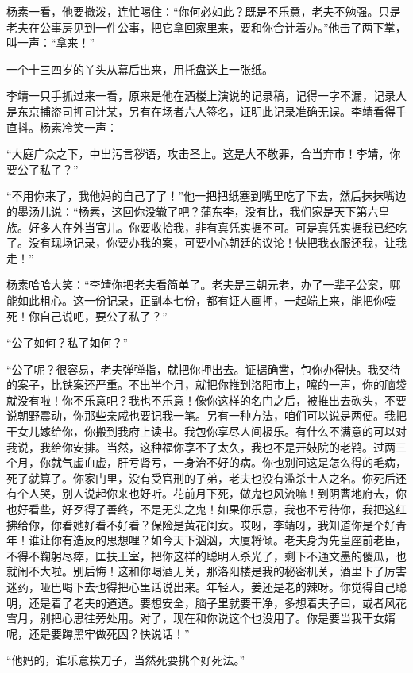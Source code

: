 杨素一看，他要撤泼，连忙喝住：“你何必如此？既是不乐意，老夫不勉强。只是老夫在公事房见到一件公事，把它拿回家里来，要和你合计着办。”他击了两下掌，叫一声：“拿来！”

一个十三四岁的丫头从幕后出来，用托盘送上一张纸。

李靖一只手抓过来一看，原来是他在酒楼上演说的记录稿，记得一字不漏，记录人是东京捕盗司押司计某，另有在场者六人签名，证明此记录准确无误。李靖看得手直抖。杨素冷笑一声：

“大庭广众之下，中出污言秽语，攻击圣上。这是大不敬罪，合当弃市！李靖，你要公了私了？”

“不用你来了，我他妈的自己了了！”他一把把纸塞到嘴里吃了下去，然后抹抹嘴边的墨汤儿说：“杨素，这回你没辙了吧？蒲东李，没有比，我们家是天下第六皇族。好多人在外当官儿。你要收拾我，非有真凭实据不可。可是真凭实据我已经吃了。没有现场记录，你要办我的案，可要小心朝廷的议论！快把我衣服还我，让我走！”

杨素哈哈大笑：“李靖你把老夫看简单了。老夫是三朝元老，办了一辈子公案，哪能如此粗心。这一份记录，正副本七份，都有证人画押，一起端上来，能把你噎死！你自己说吧，要公了私了？”

“公了如何？私了如何？”

“公了呢？很容易，老夫弹弹指，就把你押出去。证据确凿，包你办得快。我交待的案子，比铁案还严重。不出半个月，就把你推到洛阳市上，嚓的一声，你的脑袋就没有啦！你不乐意吧？我也不乐意！像你这样的名门之后，被推出去砍头，不要说朝野震动，你那些亲戚也要记我一笔。另有一种方法，咱们可以说是两便。我把干女儿嫁给你，你搬到我府上读书。我包你享尽人间极乐。有什么不满意的可以对我说，我给你安排。当然，这种福你享不了太久，我也不是开妓院的老鸨。过两三个月，你就气虚血虚，肝亏肾亏，一身治不好的病。你也别问这是怎么得的毛病，死了就算了。你家门里，没有受官刑的子弟，老夫也没有滥杀士人之名。你死后还有个人哭，别人说起你来也好听。花前月下死，做鬼也风流嘛！到阴曹地府去，你也好看些，好歹得了善终，不是无头之鬼！如果你乐意，我也不亏待你，我把这红拂给你，你看她好看不好看？保险是黄花闺女。哎呀，李靖呀，我知道你是个好青年！谁让你有造反的思想哩？如今天下汹汹，大厦将倾。老夫身为先皇座前老臣，不得不鞠躬尽瘁，匡扶王室，把你这样的聪明人杀光了，剩下不通文墨的傻瓜，也就闹不大啦。别后悔！这和你喝酒无关，那洛阳楼是我的秘密机关，酒里下了厉害迷药，哑巴喝下去也得把心里话说出来。年轻人，姜还是老的辣呀。你觉得自己聪明，还是着了老夫的道道。要想安全，脑子里就要干净，多想着夫子曰，或者风花雪月，别把心思往旁处用。对了，现在和你说这个也没用了。你是要当我干女婿呢，还是要蹲黑牢做死囚？快说话！”

“他妈的，谁乐意挨刀子，当然死要挑个好死法。”

